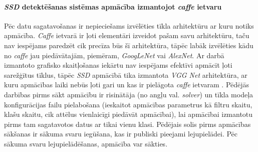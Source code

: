\paragraph{\textit{SSD} detektēšanas sistēmas apmācība izmantojot \textit{caffe} ietvaru}
\hfill\par
Pēc datu sagatavošanas ir nepieciešams izvēlēties tīkla arhitektūru ar kuru notiks apmācība. \textit{Caffe} ietvarā ir ļoti elementāri izveidot pašam savu arhitektūru, taču nav iespējams paredzēt cik precīza būs šī arhitektūra, tāpēc labāk izvēlēties kādu no \textit{caffe} jau piedāvātajām, piemēram, \textit{GoogLeNet} vai \textit{AlexNet}. Ar darbā izmantoto grafisko skaitļošanas iekārtu nav iespējams efektīvi apmācīt ļoti sarežģītus tīklus, tāpēc \textit{SSD} apmācībā tika izmantota \textit{VGG Net} arhitektūra, ar kuru apmācības laiki nebūs ļoti gari un kas ir pielāgota \textit{caffe} ietvaram \cite{ssdmodel}. Pēdējās darbības pirms sākt apmācību ir risinātāja (no angļu val. \textit{solver}) un tīkla modeļa konfigurācijas failu pielabošana (ieskaitot apmācības parametrus kā filtru skaitu, klašu skaitu, cik attēlus vienlaicīgi piedāvāt apmācībai), lai apmācībai izmantotu pirms tam sagatavotos datus ar tikai vienu klasi. Pēdējais solis pirms apmācības sākšanas ir sākuma svaru iegūšana, kas ir publiski pieejami lejupielādei. Pēc sākuma svaru lejupielādēšanas, apmācība var sākties. 

